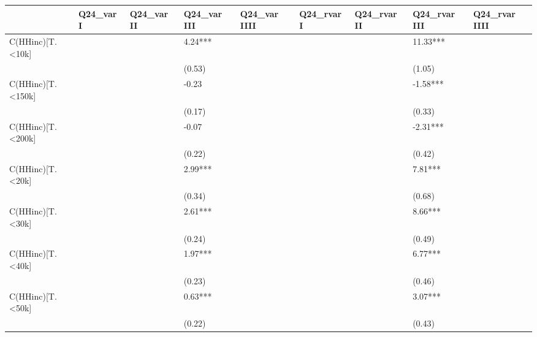 \documentclass{report}
\begin{document}
\begin{table}\begin{tabular}{lllllllll}
\toprule
{} & Q24\_var I & Q24\_var II & Q24\_var III & Q24\_var IIII & Q24\_rvar I & Q24\_rvar II & Q24\_rvar III & Q24\_rvar IIII \\
\midrule
C(HHinc)[T.<10k]   &           &            &     4.24*** &              &            &             &     11.33*** &               \\
                   &           &            &      (0.53) &              &            &             &       (1.05) &               \\
C(HHinc)[T.<150k]  &           &            &       -0.23 &              &            &             &     -1.58*** &               \\
                   &           &            &      (0.17) &              &            &             &       (0.33) &               \\
C(HHinc)[T.<200k]  &           &            &       -0.07 &              &            &             &     -2.31*** &               \\
                   &           &            &      (0.22) &              &            &             &       (0.42) &               \\
C(HHinc)[T.<20k]   &           &            &     2.99*** &              &            &             &      7.81*** &               \\
                   &           &            &      (0.34) &              &            &             &       (0.68) &               \\
C(HHinc)[T.<30k]   &           &            &     2.61*** &              &            &             &      8.66*** &               \\
                   &           &            &      (0.24) &              &            &             &       (0.49) &               \\
C(HHinc)[T.<40k]   &           &            &     1.97*** &              &            &             &      6.77*** &               \\
                   &           &            &      (0.23) &              &            &             &       (0.46) &               \\
C(HHinc)[T.<50k]   &           &            &     0.63*** &              &            &             &      3.07*** &               \\
                   &           &            &      (0.22) &              &            &             &       (0.43) &               \\

\end{tabular}
\end{table}
\end{document}
